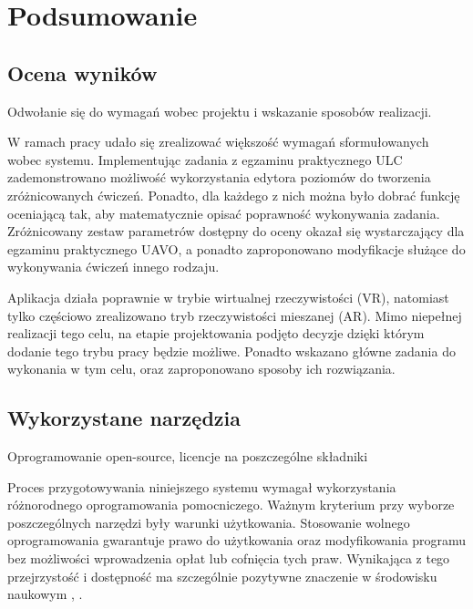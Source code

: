 \newpage
\section{Podsumowanie}

\subsection{Ocena wyników}
\begin{todo}
    Odwołanie się do wymagań wobec projektu i wskazanie sposobów realizacji.
\end{todo}
W ramach pracy udało się zrealizować większość wymagań sformułowanych wobec systemu. Implementując zadania z egzaminu praktycznego ULC zademonstrowano możliwość wykorzystania edytora poziomów do tworzenia zróżnicowanych ćwiczeń. Ponadto, dla każdego z nich można było dobrać funkcję oceniającą tak, aby matematycznie opisać poprawność wykonywania zadania. Zróżnicowany zestaw parametrów dostępny do oceny okazał się wystarczający dla egzaminu praktycznego UAVO, a ponadto zaproponowano modyfikacje służące do wykonywania ćwiczeń innego rodzaju.

Aplikacja działa poprawnie w trybie wirtualnej rzeczywistości (VR), natomiast tylko częściowo zrealizowano tryb rzeczywistości mieszanej (AR). Mimo niepełnej realizacji tego celu, na etapie projektowania podjęto decyzje dzięki którym dodanie tego trybu pracy będzie możliwe. Ponadto wskazano główne zadania do wykonania w tym celu, oraz zaproponowano sposoby ich rozwiązania.

\subsection{Wykorzystane narzędzia}
\begin{todo}
    Oprogramowanie open-source, licencje na poszczególne składniki
\end{todo}
Proces przygotowywania niniejszego systemu wymagał wykorzystania różnorodnego oprogramowania pomocniczego. Ważnym kryterium przy wyborze poszczególnych narzędzi były warunki użytkowania. Stosowanie wolnego oprogramowania gwarantuje prawo do użytkowania oraz modyfikowania programu bez możliwości wprowadzenia opłat lub cofnięcia tych praw. Wynikająca z tego przejrzystość i dostępność ma szczególnie pozytywne znaczenie w środowisku naukowym \cite{courant2006}, \cite{lakhan2008}.

